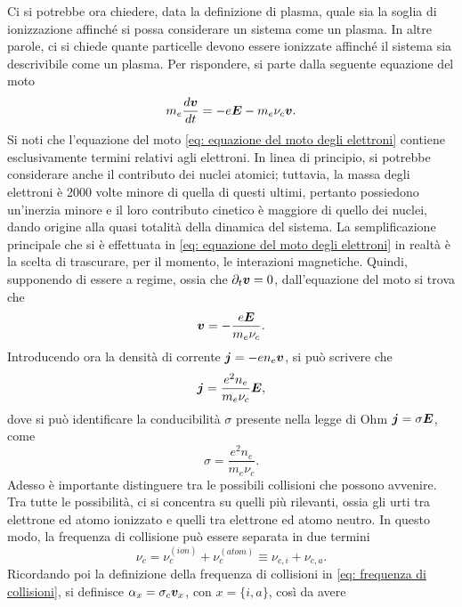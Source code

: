 Ci si potrebbe ora chiedere, data la definizione di plasma, quale sia la soglia di ionizzazione affinché si possa considerare un sistema come un plasma. In altre parole, ci si chiede quante particelle devono essere ionizzate affinché il sistema sia descrivibile come un plasma. Per rispondere, si parte dalla seguente equazione del moto
\begin{equation}
\label{eq: equazione del moto degli elettroni}
    m_e\frac{d\bm{v}}{dt} = -e\bm{E} - m_e\nu_c\bm{v}.
\end{equation}
Si noti che l'equazione del moto \eqref{eq: equazione del moto degli elettroni} contiene esclusivamente termini relativi agli elettroni. In linea di principio, si potrebbe considerare anche il contributo dei nuclei atomici; tuttavia, la massa degli elettroni è 2000 volte minore di quella di questi ultimi, pertanto possiedono un'inerzia minore e il loro contributo cinetico è maggiore di quello dei nuclei, dando origine alla quasi totalità della dinamica del sistema. La semplificazione principale che si è effettuata in \eqref{eq: equazione del moto degli elettroni} in realtà è la scelta di trascurare, per il momento, le interazioni magnetiche. Quindi, supponendo di essere a regime, ossia che $\partial_t\bm{v} = 0$, dall'equazione del moto si trova che
\begin{equation}
    \bm{v} = -\frac{e\bm{E}}{m_e\nu_c}.
\end{equation}
Introducendo ora la densità di corrente $\bm{j} = -en_e\bm{v}$, si può scrivere che
\begin{equation}
    \bm{j} = \frac{e^2n_e}{m_e\nu_c}\bm{E},
\end{equation}
dove si può identificare la conducibilità $\sigma$ presente nella legge di Ohm $\bm{j} = \sigma\bm{E}$, come 
\begin{equation}
    \sigma = \frac{e^2n_e}{m_e\nu_c}.
\end{equation}
Adesso è importante distinguere tra le possibili collisioni che possono avvenire. Tra tutte le possibilità, ci si concentra su quelli più rilevanti, ossia gli urti tra elettrone ed atomo ionizzato e quelli tra elettrone ed atomo neutro. In questo modo, la frequenza di collisione può essere separata in due termini
\begin{equation}
    \nu_c = \nu_c^{(ion)} + \nu_c^{(atom)} \equiv \nu_{c,i} + \nu_{c,a}.
\end{equation}
Ricordando poi la definizione della frequenza di collisioni in \eqref{eq: frequenza di collisioni}, si definisce $\alpha_x = \sigma_c\bm{v}_x$, con $x = \{i,a\}$, così da avere 
